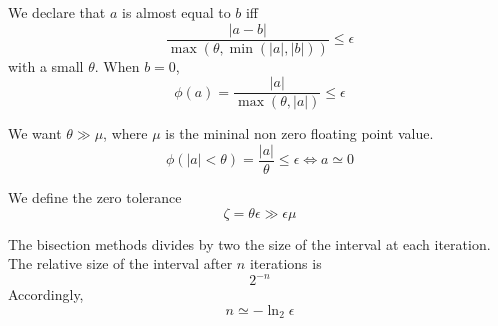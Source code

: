 \documentclass[aps,12pt]{revtex4}
\begin{document}
We declare that $a$ is almost equal to $b$ iff
\begin{equation}
	\dfrac{\vert a - b \vert}{ \max(\theta,\min(\vert a \vert,\vert b \vert)) } \leq \epsilon
\end{equation}
with a small $\theta$.
When $b=0$, 
\begin{equation}
	\phi(a) = \dfrac{\vert a \vert }{ \max(\theta,\vert a \vert) } \leq \epsilon
\end{equation}

We want $\theta \gg \mu$, where $\mu$ is the mininal non zero floating point value.
\begin{equation}
\phi(|a|<\theta) = \dfrac{|a|}{\theta} \leq \epsilon \iff a \simeq 0
\end{equation}

We define the zero tolerance
\begin{equation}
	\zeta = \theta \epsilon \gg \epsilon \mu
\end{equation}


\vspace{3cm}



The bisection methods divides by two the size of the interval at each iteration.
The relative size of the interval after $n$ iterations is
$$
	 2^{-n}
$$
Accordingly, 
$$
	n \simeq -\ln_2 \epsilon
$$
\end{document}
